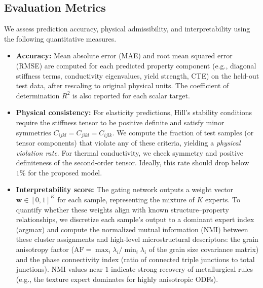 \documentclass{article}
\begin{document}
\subsection{Evaluation Metrics}
We assess prediction accuracy, physical admissibility, and interpretability using the following quantitative measures.
\begin{itemize}
    \item \textbf{Accuracy:} Mean absolute error (MAE) and root mean squared error (RMSE) are computed for each predicted property component (e.g., diagonal stiffness terms, conductivity eigenvalues, yield strength, CTE) on the held-out test data, after rescaling to original physical units. The coefficient of determination $R^2$ is also reported for each scalar target.
    
    \item \textbf{Physical consistency:} For elasticity predictions, Hill's stability conditions require the stiffness tensor to be positive definite and satisfy minor symmetries $C_{ijkl} = C_{jikl} = C_{ijlk}$. We compute the fraction of test samples (or tensor components) that violate any of these criteria, yielding a \emph{physical violation rate}. For thermal conductivity, we check symmetry and positive definiteness of the second-order tensor. Ideally, this rate should drop below $1\%$ for the proposed model.
    
    \item \textbf{Interpretability score:} The gating network outputs a weight vector $\mathbf{w}\in[0,1]^K$ for each sample, representing the mixture of $K$ experts. To quantify whether these weights align with known structure–property relationships, we discretize each sample's output to a dominant expert index (argmax) and compute the normalized mutual information (NMI) between these cluster assignments and high-level microstructural descriptors: the grain anisotropy factor ($\text{AF} = \max_i \lambda_i/\min_i \lambda_i$ of the grain size covariance matrix) and the phase connectivity index (ratio of connected triple junctions to total junctions). NMI values near $1$ indicate strong recovery of metallurgical rules (e.g., the texture expert dominates for highly anisotropic ODFs).
\end{itemize}
\end{document}
